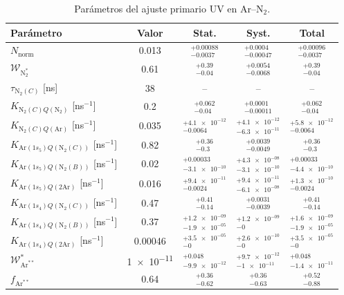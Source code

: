 \begin{table}[htbp]
\centering
\caption{Parámetros del ajuste primario UV en Ar--N$_2$.}
\label{tab:ArN2_primary_stat_syst}
\begin{tabular}{lcccc}
\toprule
Parámetro & Valor & Stat. & Syst. & Total \\
\midrule
$N_{\mathrm{norm}}$ & \num{0.013} & $^{+\num{0.00088}}_{-\num{0.0037}}$ & $^{+\num{0.0004}}_{-\num{0.00047}}$ & $^{+\num{0.00096}}_{-\num{0.0037}}$ \\
$\mathcal{W}_{\mathrm{N}_2^*}$ & \num{0.61} & $^{+\num{0.39}}_{-\num{0.04}}$ & $^{+\num{0.0054}}_{-\num{0.0068}}$ & $^{+\num{0.39}}_{-\num{0.04}}$ \\
$\tau_{\mathrm{N}_2(C)}$ [ns] & \num{38} & -- & -- & -- \\
$K_{\mathrm{N}_2(C)Q(\mathrm{N}_2)}$ [ns$^{-1}$] & \num{0.2} & $^{+\num{0.062}}_{-\num{0.04}}$ & $^{+\num{0.0001}}_{-\num{0.00011}}$ & $^{+\num{0.062}}_{-\num{0.04}}$ \\
$K_{\mathrm{N}_2(C)Q(\mathrm{Ar})}$ [ns$^{-1}$] & \num{0.035} & $^{+\num{4.1e-12}}_{-\num{0.0064}}$ & $^{+\num{4.1e-12}}_{-\num{6.3e-11}}$ & $^{+\num{5.8e-12}}_{-\num{0.0064}}$ \\
$K_{\mathrm{Ar}(1s_5)Q(\mathrm{N}_2(C))}$ [ns$^{-1}$] & \num{0.82} & $^{+\num{0.36}}_{-\num{0.3}}$ & $^{+\num{0.0039}}_{-\num{0.0049}}$ & $^{+\num{0.36}}_{-\num{0.3}}$ \\
$K_{\mathrm{Ar}(1s_5)Q(\mathrm{N}_2(B))}$ [ns$^{-1}$] & \num{0.02} & $^{+\num{0.00033}}_{-\num{3.1e-10}}$ & $^{+\num{4.3e-08}}_{-\num{3.1e-10}}$ & $^{+\num{0.00033}}_{-\num{4.4e-10}}$ \\
$K_{\mathrm{Ar}(1s_5)Q(2\mathrm{Ar})}$ [ns$^{-1}$] & \num{0.016} & $^{+\num{9.4e-11}}_{-\num{0.0024}}$ & $^{+\num{9.4e-11}}_{-\num{6.1e-08}}$ & $^{+\num{1.3e-10}}_{-\num{0.0024}}$ \\
$K_{\mathrm{Ar}(1s_4)Q(\mathrm{N}_2(C))}$ [ns$^{-1}$] & \num{0.47} & $^{+\num{0.41}}_{-\num{0.14}}$ & $^{+\num{0.0031}}_{-\num{0.0039}}$ & $^{+\num{0.41}}_{-\num{0.14}}$ \\
$K_{\mathrm{Ar}(1s_4)Q(\mathrm{N}_2(B))}$ [ns$^{-1}$] & \num{0.37} & $^{+\num{1.2e-09}}_{-\num{1.9e-05}}$ & $^{+\num{1.2e-09}}_{-\num{0}}$ & $^{+\num{1.6e-09}}_{-\num{1.9e-05}}$ \\
$K_{\mathrm{Ar}(1s_4)Q(2\mathrm{Ar})}$ [ns$^{-1}$] & \num{0.00046} & $^{+\num{3.5e-05}}_{-\num{0}}$ & $^{+\num{2.6e-10}}_{-\num{0}}$ & $^{+\num{3.5e-05}}_{-\num{0}}$ \\
$\mathcal{W}_{\mathrm{Ar}^{**}}^*$ & \num{1e-11} & $^{+\num{0.048}}_{-\num{9.9e-12}}$ & $^{+\num{9.7e-12}}_{-\num{1e-11}}$ & $^{+\num{0.048}}_{-\num{1.4e-11}}$ \\
$f_{\mathrm{Ar}^{**}}$ & \num{0.64} & $^{+\num{0.36}}_{-\num{0.62}}$ & $^{+\num{0.36}}_{-\num{0.63}}$ & $^{+\num{0.52}}_{-\num{0.88}}$ \\
\bottomrule
\end{tabular}
\end{table}
